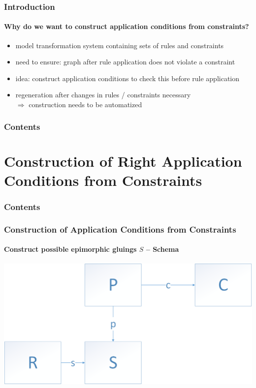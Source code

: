 \documentclass[32pt,t]{beamer}
\begin{document}
	\begin{frame}
		\frametitle{Introduction}
		\framesubtitle{Why do we want to construct application conditions from constraints?}		
		\begin{itemize}
			\item model transformation system containing sets of rules and constraints
			\item need to ensure: graph after rule application does not violate a constraint
			\item idea: construct application conditions to check this before rule application
			\item regeneration after changes in rules / constraints necessary \\
			$\Rightarrow$ construction needs to be automatized 
		\end{itemize}
	\end{frame}
	
	\begin{frame}
		\frametitle{Contents}
		\tableofcontents
	\end{frame}

\section{Construction of Right Application Conditions from Constraints}
	\begin{frame}
		\frametitle{Contents}
		\tableofcontents[currentsection]
	\end{frame}

	\begin{frame}
		\frametitle{Construction of Application Conditions from Constraints}
		\framesubtitle{Construct possible epimorphic gluings $S$ -- Schema}
		\centering
		\includegraphics[width=\linewidth]{Images/10_Construct_S_Schema}
	\end{frame}
\end{document}
